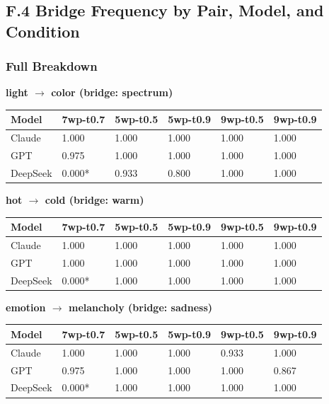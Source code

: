 \subsection{F.4 Bridge Frequency by Pair, Model, and Condition}\label{f.4-bridge-frequency-by-pair-model-and-condition}

\subsubsection{Full Breakdown}\label{full-breakdown-1}

\textbf{light \(\to\) color (bridge: spectrum)}

\begin{longtable}[]{@{}llllll@{}}
\toprule\noalign{}
Model & 7wp-t0.7 & 5wp-t0.5 & 5wp-t0.9 & 9wp-t0.5 & 9wp-t0.9 \\
\midrule\noalign{}
\endhead
\bottomrule\noalign{}
\endlastfoot
Claude & 1.000 & 1.000 & 1.000 & 1.000 & 1.000 \\
GPT & 0.975 & 1.000 & 1.000 & 1.000 & 1.000 \\
DeepSeek & 0.000* & 0.933 & 0.800 & 1.000 & 1.000 \\
\end{longtable}

\textbf{hot \(\to\) cold (bridge: warm)}

\begin{longtable}[]{@{}llllll@{}}
\toprule\noalign{}
Model & 7wp-t0.7 & 5wp-t0.5 & 5wp-t0.9 & 9wp-t0.5 & 9wp-t0.9 \\
\midrule\noalign{}
\endhead
\bottomrule\noalign{}
\endlastfoot
Claude & 1.000 & 1.000 & 1.000 & 1.000 & 1.000 \\
GPT & 1.000 & 1.000 & 1.000 & 1.000 & 1.000 \\
DeepSeek & 0.000* & 1.000 & 1.000 & 1.000 & 1.000 \\
\end{longtable}

\textbf{emotion \(\to\) melancholy (bridge: sadness)}

\begin{longtable}[]{@{}llllll@{}}
\toprule\noalign{}
Model & 7wp-t0.7 & 5wp-t0.5 & 5wp-t0.9 & 9wp-t0.5 & 9wp-t0.9 \\
\midrule\noalign{}
\endhead
\bottomrule\noalign{}
\endlastfoot
Claude & 1.000 & 1.000 & 1.000 & 0.933 & 1.000 \\
GPT & 0.975 & 1.000 & 1.000 & 1.000 & 0.867 \\
DeepSeek & 0.000* & 1.000 & 1.000 & 1.000 & 1.000 \\
\end{longtable}

